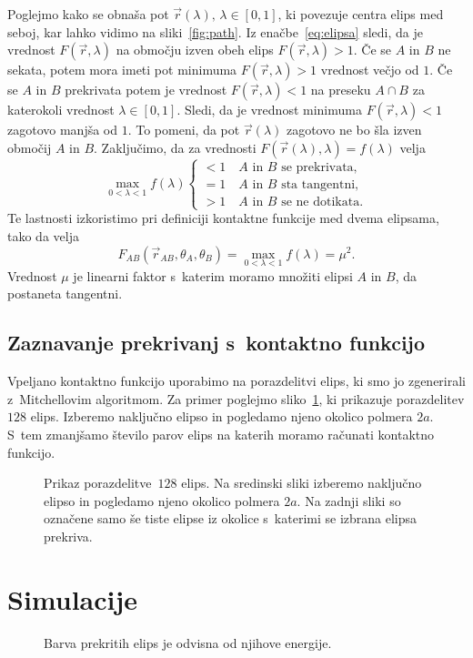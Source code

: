 \noindent Poglejmo kako se obnaša pot $\vec{r}(\lambda), \, \lambda \in [0,1]$, ki povezuje 
centra elips med seboj, kar lahko vidimo na sliki~\ref{fig:path}.
Iz enačbe~\ref{eq:elipsa} sledi, da je vrednost $F(\vec{r}, \lambda)$ na območju 
izven obeh elips $F(\vec{r}, \lambda)>1$. Če se $A$ in $B$ ne sekata, potem mora imeti 
pot minimuma $F(\vec{r}, \lambda)>1$ vrednost večjo od $1$. Če se $A$ in $B$ prekrivata 
potem je vrednost $F(\vec{r}, \lambda)<1$ na preseku $A \cap B$ za katerokoli vrednost 
$\lambda \in [0,1]$.  Sledi, da je vrednost minimuma $F(\vec{r}, \lambda)<1$ zagotovo 
manjša od $1$. To pomeni, da pot $\vec{r}(\lambda)$ zagotovo ne bo šla izven območij
$A$ in $B$. Zaključimo, da za vrednosti $F(\vec{r}(\lambda), \lambda) = 
f(\lambda)$ velja
\begin{equation}
    \max_{0<\lambda<1} f(\lambda)
    \begin{cases}
        <1 \quad\text{$A$ in $B$ se prekrivata,}\\
        =1 \quad\text{$A$ in $B$ sta tangentni,}\\
        >1 \quad\text{$A$ in $B$ se ne dotikata.}
    \end{cases}
    \label{eq:kriterij}
\end{equation}
Te lastnosti izkoristimo pri definiciji kontaktne funkcije med dvema elipsama, tako da
velja
\begin{equation}
    F_{A B}(\vec{r}_{A B}, \theta_A, \theta_B) =
    \max_{0<\lambda<1} f(\lambda) = \mu^2.
    \label{eq:kontakt}
\end{equation}
Vrednost $\mu$ je linearni faktor s~katerim moramo množiti elipsi $A$ in $B$, da 
postaneta tangentni.
\subsection{Zaznavanje prekrivanj s~kontaktno funkcijo}
Vpeljano kontaktno funkcijo uporabimo na porazdelitvi elips, ki smo jo zgenerirali
z~Mitchellovim algoritmom. 
Za primer poglejmo sliko~\ref{fig:zaznavanje_trkov}, ki prikazuje porazdelitev
$128$ elips. Izberemo naključno elipso in pogledamo njeno okolico polmera $2a$.
S~tem zmanjšamo število parov elips na katerih moramo računati kontaktno funkcijo.
\begin{figure}[!ht]
    \centering
    \resizebox{.32\textwidth}{!}{}
    \resizebox{.32\textwidth}{!}{}
    \resizebox{.32\textwidth}{!}{}
    \caption{Prikaz porazdelitve~$128$ elips.
    Na sredinski sliki izberemo naključno elipso in pogledamo njeno okolico polmera 
    $2a$. Na zadnji sliki so označene samo še tiste elipse iz okolice s~katerimi 
    se izbrana elipsa prekriva.}
    \label{fig:zaznavanje_trkov}
\end{figure}

\section{Simulacije}
\begin{figure}[!ht]
    \centering
    \resizebox{.6\textwidth}{!}{}
    \caption{Barva prekritih elips je odvisna od njihove energije.}
    \label{fig:energija}
\end{figure}